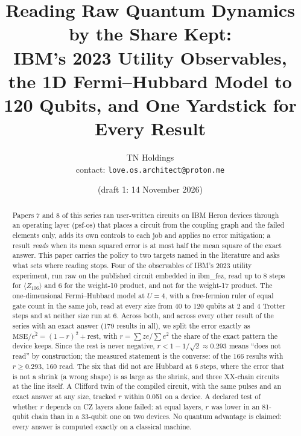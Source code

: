 \documentclass[10pt,a4paper]{article}
\title{Reading Raw Quantum Dynamics by the Share Kept:\\ IBM's 2023 Utility Observables, the 1D Fermi--Hubbard Model
to 120 Qubits, and One Yardstick for Every Result}
\author{TN Holdings\\ \small contact: \texttt{love.os.architect@proton.me}}
\date{\pending{date of release} (draft 1: 14 November 2026)}
\begin{document}
\maketitle

\begin{abstract}
Papers 7 and 8 of this series ran user-written circuits on IBM Heron devices through an operating layer (psf-os) that
places a circuit from the coupling graph and the failed elements only, adds its own controls to each job and applies
no error mitigation; a result \emph{reads} when its mean squared error is at most half the mean square of the exact
answer. This paper carries the policy to two targets named in the literature and asks what sets where reading stops.
Four of the observables of IBM's 2023 utility experiment, run raw on the published circuit embedded in ibm\_fez,
read up to 8 steps for $\langle Z_{106}\rangle$ and 6 for the weight-10 product, and not for the weight-17 product. The
one-dimensional Fermi--Hubbard model at $U = 4$, with a free-fermion ruler of equal gate count in the same job, read
at every size from 40 to 120 qubits at 2 and 4 Trotter steps and at neither size run at 6. Across both, and across
every other result of the series with an exact answer (179 results in all), we split the error exactly as
$\mathrm{MSE}/\overline{e^2} = (1-r)^2 + \text{rest}$, with $r = \sum ze/\sum e^2$ the share of the exact pattern the
device keeps. Since the rest is never negative, $r < 1 - 1/\sqrt2 \approx 0.293$ means ``does not read'' by
construction; the measured statement is the converse: of the 166 results with $r \ge 0.293$, 160 read. The six that
did not are Hubbard at 6 steps, where the error that is not a shrink (a wrong shape) is as large as the shrink, and
three XX-chain circuits at the line itself. A Clifford twin of the compiled circuit, with the same pulses and an exact
answer at any size, tracked $r$ within 0.051 on a device. A declared test of whether $r$ depends on CZ layers alone
failed: at equal layers, $r$ was lower in an 81-qubit chain than in a 33-qubit one on two devices. No quantum
advantage is claimed: every answer is computed exactly on a classical machine.
\end{abstract}
\end{document}
